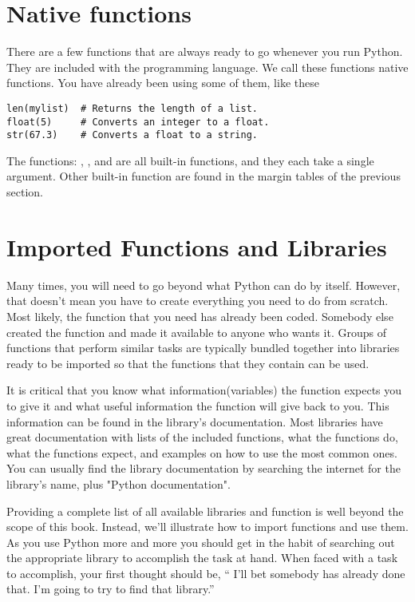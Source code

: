 \section{Native functions}
There are a few functions that are always ready to go whenever you run Python. They are included with the
programming language.  We call these functions native
functions.  You have already been using some
of them, like these
\begin{Verbatim}
len(mylist)  # Returns the length of a list.
float(5)     # Converts an integer to a float.
str(67.3)    # Converts a float to a string.
\end{Verbatim}
The functions: , , and  are all
built-in functions, and they each take a single argument.  Other
built-in function are found in the margin tables of the previous section.






\section{Imported Functions and Libraries}
Many times, you will need to go beyond what Python can do by itself. However, that doesn't mean you have to create everything you need to do from scratch.  Most likely, the function that you need has already been coded. Somebody
else created the function and made it available to anyone
who wants it.  Groups of functions that perform similar tasks are
typically bundled together into libraries ready to be imported so that the functions that they contain can be used.

It is critical that you know what information(variables) the function expects you to give it and what
useful information the function will give back to you.  This
information can be found in the library's documentation. Most libraries have great documentation with lists of the included functions, what the functions do, what the functions expect, and examples on how to use the most common ones.  You can usually find the library documentation by searching the internet for the library's name, plus "Python documentation".

Providing a complete list of all available libraries and function is well beyond
the scope of this book. Instead, we'll illustrate how to import
functions and use them.  As you use Python more and more you
should get in the habit of searching out the appropriate library to
accomplish the task at hand. When faced with a task to accomplish,
your first thought should be, `` I'll bet somebody has already done that.
I'm going to try to find that library.''



